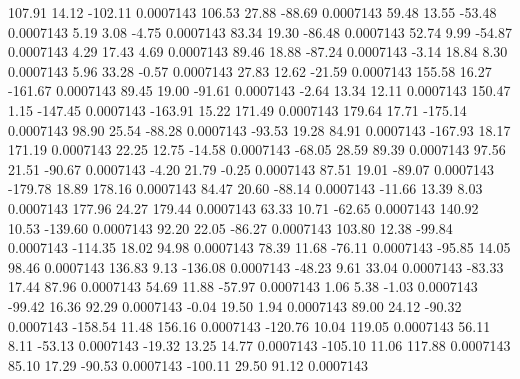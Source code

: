       107.91       14.12     -102.11     0.0007143
      106.53       27.88      -88.69     0.0007143
       59.48       13.55      -53.48     0.0007143
        5.19        3.08       -4.75     0.0007143
       83.34       19.30      -86.48     0.0007143
       52.74        9.99      -54.87     0.0007143
        4.29       17.43        4.69     0.0007143
       89.46       18.88      -87.24     0.0007143
       -3.14       18.84        8.30     0.0007143
        5.96       33.28       -0.57     0.0007143
       27.83       12.62      -21.59     0.0007143
      155.58       16.27     -161.67     0.0007143
       89.45       19.00      -91.61     0.0007143
       -2.64       13.34       12.11     0.0007143
      150.47        1.15     -147.45     0.0007143
     -163.91       15.22      171.49     0.0007143
      179.64       17.71     -175.14     0.0007143
       98.90       25.54      -88.28     0.0007143
      -93.53       19.28       84.91     0.0007143
     -167.93       18.17      171.19     0.0007143
       22.25       12.75      -14.58     0.0007143
      -68.05       28.59       89.39     0.0007143
       97.56       21.51      -90.67     0.0007143
       -4.20       21.79       -0.25     0.0007143
       87.51       19.01      -89.07     0.0007143
     -179.78       18.89      178.16     0.0007143
       84.47       20.60      -88.14     0.0007143
      -11.66       13.39        8.03     0.0007143
      177.96       24.27      179.44     0.0007143
       63.33       10.71      -62.65     0.0007143
      140.92       10.53     -139.60     0.0007143
       92.20       22.05      -86.27     0.0007143
      103.80       12.38      -99.84     0.0007143
     -114.35       18.02       94.98     0.0007143
       78.39       11.68      -76.11     0.0007143
      -95.85       14.05       98.46     0.0007143
      136.83        9.13     -136.08     0.0007143
      -48.23        9.61       33.04     0.0007143
      -83.33       17.44       87.96     0.0007143
       54.69       11.88      -57.97     0.0007143
        1.06        5.38       -1.03     0.0007143
      -99.42       16.36       92.29     0.0007143
       -0.04       19.50        1.94     0.0007143
       89.00       24.12      -90.32     0.0007143
     -158.54       11.48      156.16     0.0007143
     -120.76       10.04      119.05     0.0007143
       56.11        8.11      -53.13     0.0007143
      -19.32       13.25       14.77     0.0007143
     -105.10       11.06      117.88     0.0007143
       85.10       17.29      -90.53     0.0007143
     -100.11       29.50       91.12     0.0007143
